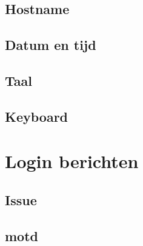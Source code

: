 \documentclass[a4paper,12pt,twoside,openright,titlepage]{book}
\begin{document}
\subsection{Hostname}

\subsection{Datum en tijd}



\subsection{Taal}

\subsection{Keyboard}


\section{Login berichten}
\subsection{Issue}

\subsection{motd}


\printindex
\end{document}
